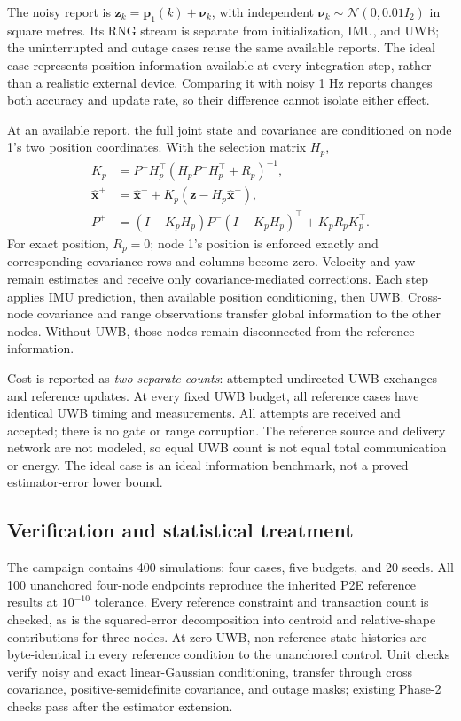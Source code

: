 The noisy report is \(\bm z_k=\bm p_1(k)+\bm\nu_k\), with independent \(\bm\nu_k\sim\mathcal N(0,0.01I_2)\) in square metres. Its RNG stream is separate from initialization, IMU, and UWB; the uninterrupted and outage cases reuse the same available reports. The ideal case represents position information available at every integration step, rather than a realistic external device. Comparing it with noisy 1 Hz reports changes both accuracy and update rate, so their difference cannot isolate either effect.

At an available report, the full joint state and covariance are conditioned on node 1's two position coordinates. With the selection matrix \(H_p\),
\begin{align}
K_p &= P^-H_p^\top(H_pP^-H_p^\top+R_p)^{-1},\\
\hat{\bm x}^+ &= \hat{\bm x}^-+K_p(\bm z-H_p\hat{\bm x}^-),\\
P^+ &= (I-K_pH_p)P^-(I-K_pH_p)^\top+K_pR_pK_p^\top.
\end{align}
For exact position, \(R_p=0\); node 1's position is enforced exactly and corresponding covariance rows and columns become zero. Velocity and yaw remain estimates and receive only covariance-mediated corrections. Each step applies IMU prediction, then available position conditioning, then UWB. Cross-node covariance and range observations transfer global information to the other nodes. Without UWB, those nodes remain disconnected from the reference information.

Cost is reported as \emph{two separate counts}: attempted undirected UWB exchanges and reference updates. At every fixed UWB budget, all reference cases have identical UWB timing and measurements. All attempts are received and accepted; there is no gate or range corruption. The reference source and delivery network are not modeled, so equal UWB count is not equal total communication or energy. The ideal case is an ideal information benchmark, not a proved estimator-error lower bound.

\subsection{Verification and statistical treatment}
The campaign contains 400 simulations: four cases, five budgets, and 20 seeds. All 100 unanchored four-node endpoints reproduce the inherited P2E reference results at \(10^{-10}\) tolerance. Every reference constraint and transaction count is checked, as is the squared-error decomposition into centroid and relative-shape contributions for three nodes. At zero UWB, non-reference state histories are byte-identical in every reference condition to the unanchored control. Unit checks verify noisy and exact linear-Gaussian conditioning, transfer through cross covariance, positive-semidefinite covariance, and outage masks; existing Phase-2 checks pass after the estimator extension.


